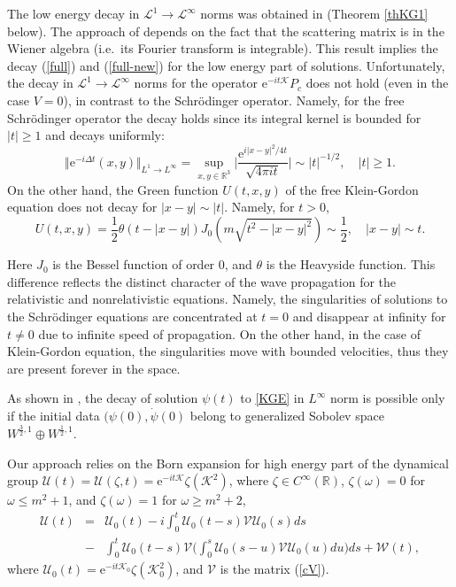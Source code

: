 \documentclass[reqno]{amsart}
\newcommand{\R}{{\mathbb R}}
\newcommand{\cL}{{\mathcal L}}
\newcommand{\cK}{{\mathcal K}}
\newcommand{\cV}{{\mathcal V}}
\newcommand{\cU}{{\mathcal U}}
\newcommand{\E}{\mathrm{e}}
\numberwithin{equation}{section}
\begin{document}
The low energy   decay in $\cL^1\to \cL^\infty$ norms  was obtained in \cite {EKTM} (Theorem \ref{thKG1} below).
The approach of \cite {EKTM}  depends on the fact that the scattering matrix is in the Wiener algebra (i.e.\ its Fourier transform
is integrable). 
This result  implies the decay  (\ref{full})  and (\ref{full-new}) for the low energy part of solutions.
Unfortunately,  the decay  in $\cL^1\to \cL^\infty$ norms for the operator 
$\E^{-it\cK}P_c$ does not hold (even in the case $V=0$), in contrast to the Schr\"odinger operator. 
Namely,  for the free Schr\"odinger operator  the decay holds since  its integral kernel is bounded for $|t|\ge 1$ and  decays uniformly:
 \begin{equation}\label{full0}
\Vert \E^{-i\Delta t}(x,y)\Vert_{L^1\to L^{\infty}}
=\sup\limits_{x,y\in\R^3}\Big|\frac{\E^{i|x-y|^2/4t}}{\sqrt{4\pi it}}\Big|
\sim |t|^{-1/2},\quad |t|\ge 1.
\end{equation}
On the other hand, the Green function  $U(t,x,y)$ of the free Klein-Gordon equation does not decay for $|x-y|\sim |t|$. Namely, for $t>0$,
\begin{equation}\label{U}
 U(t,x,y)=\frac{1}{2}\theta(t-|x-y|)J_{0}(m\sqrt{t^{2}-|x-y|^{2}})\sim \frac 12,\quad  |x-y|\sim t.
\end{equation}

Here $J_{0}$ is the Bessel function of order 0, and $\theta$ is the Heavyside function.
This difference  reflects the distinct character of the wave propagation 
for the relativistic and nonrelativistic equations.
Namely, the  singularities of solutions  to the Schr\"odinger equations are concentrated at $t=0$ and disappear at infinity for $t\ne 0$ due to
infinite speed of propagation. On the other hand, in the case of  Klein-Gordon equation, the singularities move
with bounded velocities, thus they are present forever in the space.

As shown in  \cite {EKTM},  the decay  of solution $\psi(t)$ to \eqref{KGE} in $L^\infty$ norm  is possible only if  
the initial data $(\psi(0),\dot\psi(0)$ belong to generalized Sobolev space $W^{\frac 32,1}\oplus W^{\frac 12,1}$.


Our approach relies on the  
Born expansion for high energy part of the dynamical group $\cU(t)=\cU(\zeta,t)=\E^{-it\cK}\zeta (\cK^2)$,  where 
$\zeta\in C^\infty(\R)$, $\zeta(\omega)=0$ for $\omega\le m^2+1$, and
$\zeta(\omega)=1$ for $\omega\geq m^2 + 2$,
\begin{eqnarray}\nonumber
\cU(t)&=&\cU_0(t)-i\int_0^t \cU_0(t-s){\mathcal V} \cU_0 (s)ds\\
\nonumber
&-&\int_0^t \cU_0(t-s){\mathcal V}\Big(\int_0^{s} \cU_0 (s-u){\mathcal V} \cU_0 (u)du\Big)ds+{\mathcal W}(t),
\end{eqnarray}
where $\cU_0(t)=\E^{-it\cK_0}\zeta (\cK_0^2)$, and 
$\cV$ is the matrix (\ref{cV}).
\end{document}
